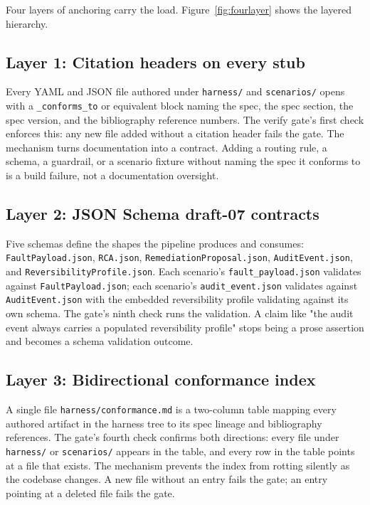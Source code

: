 \documentclass[twocolumn,10pt,a4paper]{article}
\begin{document}
Four layers of anchoring carry the load. Figure~\ref{fig:fourlayer} shows the layered hierarchy.

\subsection{Layer 1: Citation headers on every stub}

Every YAML and JSON file authored under \texttt{harness/} and \texttt{scenarios/} opens with a \texttt{\_conforms\_to} or equivalent block naming the spec, the spec section, the spec version, and the bibliography reference numbers. The verify gate's first check enforces this: any new file added without a citation header fails the gate. The mechanism turns documentation into a contract. Adding a routing rule, a schema, a guardrail, or a scenario fixture without naming the spec it conforms to is a build failure, not a documentation oversight.

\subsection{Layer 2: JSON Schema draft-07 contracts}

Five schemas define the shapes the pipeline produces and consumes: \texttt{FaultPayload.json}, \texttt{RCA.json}, \texttt{RemediationProposal.json}, \texttt{AuditEvent.json}, and \texttt{ReversibilityProfile.json}. Each scenario's \texttt{fault\_payload.json} validates against \texttt{FaultPayload.json}; each scenario's \texttt{audit\_event.json} validates against \texttt{AuditEvent.json} with the embedded reversibility profile validating against its own schema. The gate's ninth check runs the validation. A claim like "the audit event always carries a populated reversibility profile" stops being a prose assertion and becomes a schema validation outcome.

\subsection{Layer 3: Bidirectional conformance index}

A single file \texttt{harness/conformance.md} is a two-column table mapping every authored artifact in the harness tree to its spec lineage and bibliography references. The gate's fourth check confirms both directions: every file under \texttt{harness/} or \texttt{scenarios/} appears in the table, and every row in the table points at a file that exists. The mechanism prevents the index from rotting silently as the codebase changes. A new file without an entry fails the gate; an entry pointing at a deleted file fails the gate.
\end{document}
